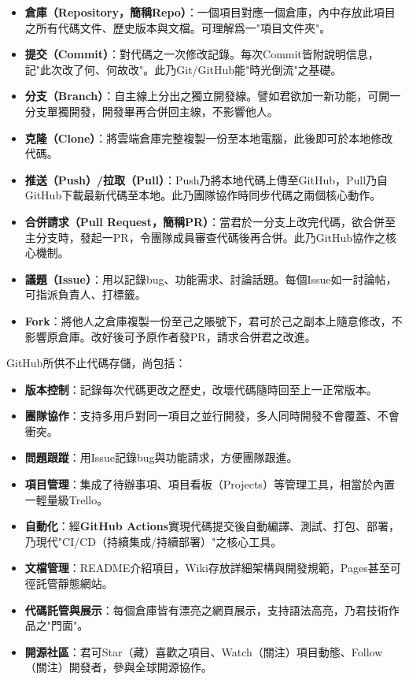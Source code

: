 \begin{itemize}
  \item \textbf{倉庫（Repository，簡稱Repo）}：一個項目對應一個倉庫，內中存放此項目之所有代碼文件、歷史版本與文檔。可理解爲一"項目文件夾"。
  \item \textbf{提交（Commit）}：對代碼之一次修改記錄。每次Commit皆附說明信息，記"此次改了何、何故改"。此乃Git/GitHub能"時光倒流"之基礎。
  \item \textbf{分支（Branch）}：自主線上分出之獨立開發線。譬如君欲加一新功能，可開一分支單獨開發，開發畢再合併回主線，不影響他人。
  \item \textbf{克隆（Clone）}：將雲端倉庫完整複製一份至本地電腦，此後即可於本地修改代碼。
  \item \textbf{推送（Push）/拉取（Pull）}：Push乃將本地代碼上傳至GitHub，Pull乃自GitHub下載最新代碼至本地。此乃團隊協作時同步代碼之兩個核心動作。
  \item \textbf{合併請求（Pull Request，簡稱PR）}：當君於一分支上改完代碼，欲合併至主分支時，發起一PR，令團隊成員審查代碼後再合併。此乃GitHub協作之核心機制。
  \item \textbf{議題（Issue）}：用以記錄bug、功能需求、討論話題。每個Issue如一討論帖，可指派負責人、打標籤。
  \item \textbf{Fork}：將他人之倉庫複製一份至己之賬號下，君可於己之副本上隨意修改，不影響原倉庫。改好後可予原作者發PR，請求合併君之改進。
\end{itemize}


GitHub所供不止代碼存儲，尚包括：

\begin{itemize}
  \item \textbf{版本控制}：記錄每次代碼更改之歷史，改壞代碼隨時回至上一正常版本。
  \item \textbf{團隊協作}：支持多用戶對同一項目之並行開發，多人同時開發不會覆蓋、不會衝突。
  \item \textbf{問題跟蹤}：用Issue記錄bug與功能請求，方便團隊跟進。
  \item \textbf{項目管理}：集成了待辦事項、項目看板（Projects）等管理工具，相當於內置一輕量級Trello。
  \item \textbf{自動化}：經\textbf{GitHub Actions}實現代碼提交後自動編譯、測試、打包、部署，乃現代"CI/CD（持續集成/持續部署）"之核心工具。
  \item \textbf{文檔管理}：README介紹項目，Wiki存放詳細架構與開發規範，Pages甚至可徑託管靜態網站。
  \item \textbf{代碼託管與展示}：每個倉庫皆有漂亮之網頁展示，支持語法高亮，乃君技術作品之"門面"。
  \item \textbf{開源社區}：君可Star（藏）喜歡之項目、Watch（關注）項目動態、Follow（關注）開發者，參與全球開源協作。
\end{itemize}

